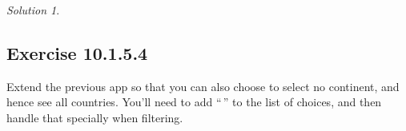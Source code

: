 \documentclass[
]{book}
\newenvironment{Shaded}{\begin{snugshade}}{\end{snugshade}}
\newcommand{\AttributeTok}[1]{\textcolor[rgb]{0.77,0.63,0.00}{#1}}
\newcommand{\FunctionTok}[1]{\textcolor[rgb]{0.00,0.00,0.00}{#1}}
\newcommand{\NormalTok}[1]{#1}
\newcommand{\OtherTok}[1]{\textcolor[rgb]{0.56,0.35,0.01}{#1}}
\newcommand{\SpecialCharTok}[1]{\textcolor[rgb]{0.00,0.00,0.00}{#1}}
\theoremstyle{definition}
\theoremstyle{definition}
\theoremstyle{definition}
\theoremstyle{definition}
\theoremstyle{remark}
\newtheorem*{solution}{Solution}
\begin{document}
\begin{solution}
\begin{Shaded}
\end{Shaded}

\end{solution}

\hypertarget{exercise-10.1.5.4}{%
\subsection*{Exercise 10.1.5.4}\label{exercise-10.1.5.4}}

Extend the previous app so that you can also choose to select no continent, and hence see all countries. You'll need to add ``\,'' to the list of choices, and then handle that specially when filtering.
\end{document}
